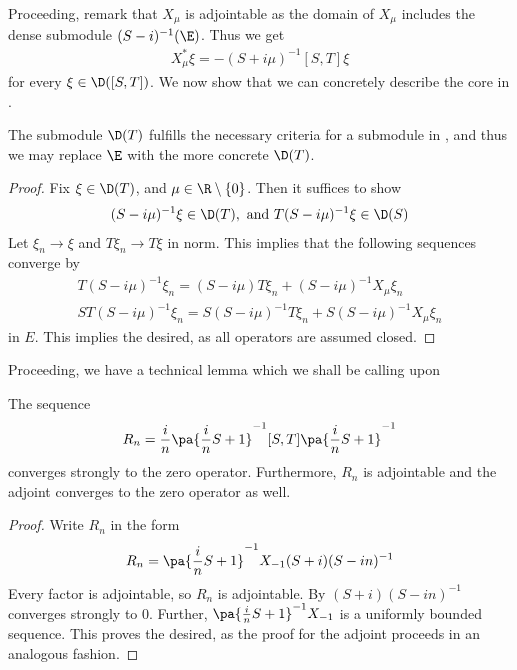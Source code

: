 Proceeding, remark that $X_\mu$ is adjointable as the domain of $X_\mu$ includes the dense submodule $(S-i)^{-1}(\E)$. Thus we get
\begin{align*}
	X_\mu^*\xi=-(S+i\mu)^{-1}[S,T]\xi
\end{align*}
for every $\xi\in \D([S,T])$. We now show that we can concretely describe the core in . 
\begin{lemma}\label{locglob73}
	The submodule $\D(T)$ fulfills the necessary criteria for a submodule in , and thus we may replace $\E$ with the more concrete $\D(T)$. 
\end{lemma}
\begin{proof}
	Fix $\xi\in \D(T)$, and $\mu \in \R\setminus \{0\}$. Then it suffices to show 
	\begin{align*}
		(S-i\mu)^{-1}\xi\in \D(T), \text{ and } T(S-i\mu)^{-1}\xi\in \D(S)
	\end{align*}
	Let $\xi_n\to \xi$ and $T\xi_n\to T\xi$ in norm. This implies that the following sequences converge by 
	\begin{align*}
		T(S-i\mu)^{-1}\xi_n=(S-i\mu)T\xi_n+(S-i\mu)^{-1}X_\mu\xi_n \\
		ST(S-i\mu)^{-1}\xi_n=S(S-i\mu)^{-1}T\xi_n+S(S-i\mu)^{-1}X_\mu\xi_n
	\end{align*}
	in $E$. This implies the desired, as all operators are assumed closed. 
\end{proof}
Proceeding, we have a technical lemma which we shall be calling upon
\begin{lemma}\label{convergestozero1}
	The sequence
	\begin{align*}
		R_n=\frac{i}{n}\pa{\frac{i}{n}S+1}^{-1}[S,T]\pa{\frac{i}{n}S+1}^{-1}
	\end{align*}
	converges strongly to the zero operator. Furthermore, $R_n$ is adjointable and the adjoint converges to the zero operator as well.
\end{lemma}
\begin{proof}
	Write $R_n$ in the form
	\begin{align*}
		R_n=\pa{\frac{i}{n}S+1}^{-1}X_{-1}(S+i)(S-in)^{-1} 
	\end{align*}
	Every factor is adjointable, so $R_n$ is adjointable. By  $(S+i)(S-in)^{-1}$ converges strongly to 0. Further, $\pa{\frac{i}{n}S+1}^{-1}X_{-1}$ is a uniformly bounded sequence. This proves the desired, as the proof for the adjoint proceeds in an analogous fashion. 
\end{proof}
